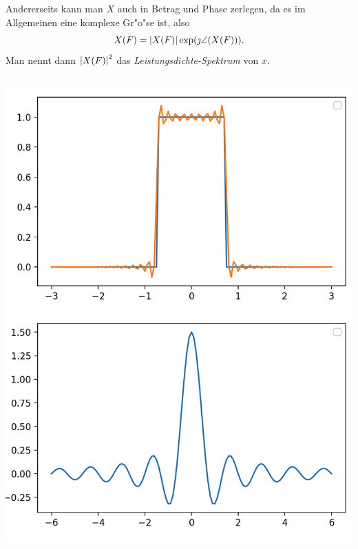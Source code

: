 Andererseits kann man $X$ auch in Betrag und Phase zerlegen, da es im Allgemeinen eine komplexe Gr"o"se ist, also
\[
X(F) = {\left| X(F) \right|} \exp(\jmath \angle(X(F))).
\]
Man nennt dann ${\left| X(F) \right|}^2$ das \emph{Leistungsdichte-Spektrum} von $x$.

\begin{listing}[h]
    \noindent
    \begin{minipage}{0.51\textwidth}
        \strut\vspace*{-\baselineskip}\newline
        \inputminted[firstline=6, lastline=45]{python3}{code/fourier_trafo.py}
    \end{minipage}%
    \begin{minipage}{0.48\textwidth}
        \strut\vspace*{-\baselineskip}\newline
        \includegraphics[width=\textwidth]{code/fourier_trafo.png}
    \end{minipage}
    \label{py:fourier_trafo}
\end{listing}


